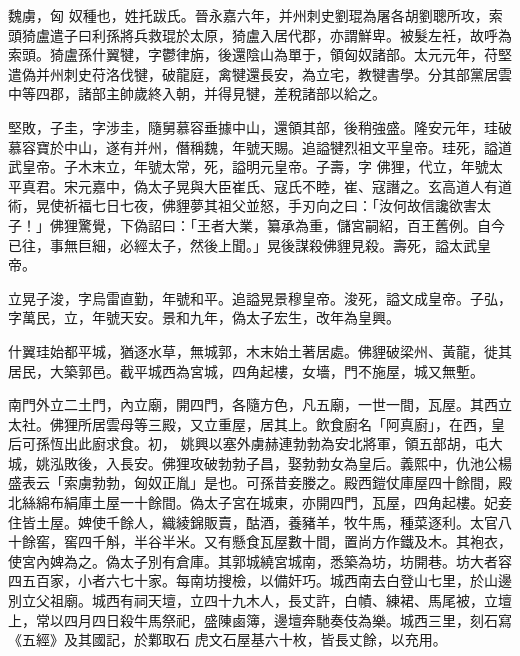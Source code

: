
\begin{pinyinscope}

 魏虜，匈
 奴種也，姓托跋氏。晉永嘉六年，并州刺史劉琨為屠各胡劉聰所攻，索頭猗盧遣子曰利孫將兵救琨於太原，猗盧入居代郡，亦謂鮮卑。被髮左衽，故呼為索頭。猗盧孫什翼犍，字鬱律旃，後還陰山為單于，領匈奴諸部。太元元年，苻堅遣偽并州刺史苻洛伐犍，破龍庭，禽犍還長安，為立宅，教犍書學。分其部黨居雲中等四郡，諸部主帥歲終入朝，并得見犍，差稅諸部以給之。



 堅敗，子圭，字涉圭，隨舅慕容垂據中山，還領其部，後稍強盛。隆安元年，珪破慕容寶於中山，遂有并州，僭稱魏，年號天賜。追謚犍烈祖文平皇帝。珪死，謚道武皇帝。子木末立，年號太常，死，謚明元皇帝。子壽，字
 佛狸，代立，年號太平真君。宋元嘉中，偽太子晃與大臣崔氏、寇氏不睦，崔、寇譖之。玄高道人有道術，晃使祈福七日七夜，佛貍夢其祖父並怒，手刃向之曰：「汝何故信讒欲害太子！」佛狸驚覺，下偽詔曰：「王者大業，纂承為重，儲宮嗣紹，百王舊例。自今已往，事無巨細，必經太子，然後上聞。」晃後謀殺佛貍見殺。壽死，謚太武皇帝。



 立晃子浚，字烏雷直勤，年號和平。追謚晃景穆皇帝。浚死，謚文成皇帝。子弘，字萬民，立，年號天安。景和九年，偽太子宏生，改年為皇興。



 什翼珪始都平城，猶逐水草，無城郭，木末始土著居處。佛貍破梁州、黃龍，徙其居民，大築郭邑。截平城西為宮城，四角起樓，女墻，門不施屋，城又無塹。



 南門外立二土門，內立廟，開四門，各隨方色，凡五廟，一世一間，瓦屋。其西立太社。佛狸所居雲母等三殿，又立重屋，居其上。飲食廚名「阿真廚」，在西，皇后可孫恆出此廚求食。初，
 姚興以塞外虜赫連勃勃為安北將軍，領五部胡，屯大城，姚泓敗後，入長安。佛狸攻破勃勃子昌，娶勃勃女為皇后。義熙中，仇池公楊盛表云「索虜勃勃，匈奴正胤」是也。可孫昔妾媵之。殿西鎧仗庫屋四十餘間，殿北絲綿布絹庫土屋一十餘間。偽太子宮在城東，亦開四門，瓦屋，四角起樓。妃妾住皆土屋。婢使千餘人，織綾錦販賣，酤酒，養豬羊，牧牛馬，種菜逐利。太官八十餘窖，窖四千斛，半谷半米。又有懸食瓦屋數十間，置尚方作鐵及木。其袍衣，使宮內婢為之。偽太子別有倉庫。其郭城繞宮城南，悉築為坊，坊開巷。坊大者容四五百家，小者六七十家。每南坊搜檢，以備奸巧。城西南去白登山七里，於山邊別立父祖廟。城西有祠天壇，立四十九木人，長丈許，白幘、練裙、馬尾被，立壇上，常以四月四日殺牛馬祭祀，盛陳鹵簿，邊壇奔馳奏伎為樂。城西三里，刻石寫《五經》及其國記，於鄴取石
 虎文石屋基六十枚，皆長丈餘，以充用。




\end{pinyinscope}
